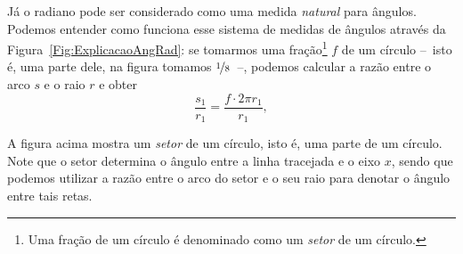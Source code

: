 Já o radiano pode ser considerado como uma medida \emph{natural} para ângulos. Podemos entender como funciona esse sistema de medidas de ângulos através da Figura~\ref{Fig:ExplicacaoAngRad}: se tomarmos uma fração\footnote{Uma fração de um círculo é denominado como um \emph{setor} de um círculo.} $f$ de um círculo --~isto é, uma parte dele, na figura tomamos $\nicefrac{1}{8}$~--, podemos calcular a razão entre o arco $s$ e o raio $r$ e obter
\begin{equation}
    \frac{s_1}{r_1} = \frac{f\cdot 2\pi r_1}{r_1},
\end{equation}
%
\begin{marginfigure}
\centering
{}
\caption{A figura acima mostra um \emph{setor} de um círculo, isto é, uma parte de um círculo. Note que o setor determina o ângulo entre a linha tracejada e o eixo $x$, sendo que podemos utilizar a razão entre o arco do setor e o seu raio para denotar o ângulo entre tais retas. \label{Fig:ExplicacaoAngRad}}
\end{marginfigure}

